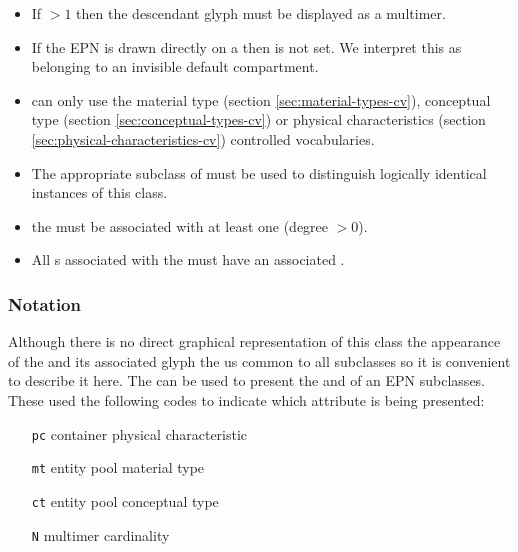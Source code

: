 \begin{itemize}
\item If  $>1$ then the descendant glyph must be displayed
  as a multimer.
\item If the EPN is drawn directly on a  then
   is not set. We interpret this as
  belonging to an invisible default compartment.
 \item {} can only use the material type (section
 \ref{sec:material-types-cv}), conceptual type (section \ref{sec:conceptual-types-cv}) or physical
 characteristics (section \ref{sec:physical-characteristics-cv}) controlled vocabularies.
\item The appropriate subclass of  must be used
  to distinguish logically identical instances of this class.
\item the  must be associated with at least
  one  (degree $> 0$).
\item All s associated with the
   must have an associated
  .
\end{itemize}

\subsubsection{Notation}

Although there is no direct graphical representation of this class the
appearance of the  and its associated glyph
the  us common to all subclasses so it is
convenient to describe it here. The  can be
used to present the  and  of an
EPN subclasses. These used the following codes to indicate which attribute
is being presented:

\begin{center}
  \begin{itemize}\setlength{\parskip}{0ex}
  \item[\texttt{pc}] container physical characteristic
  \item[\texttt{mt}] entity pool material type
  \item[\texttt{ct}] entity pool conceptual type
  \item[\texttt{N}]  multimer cardinality
  \end{itemize}
\end{center}


